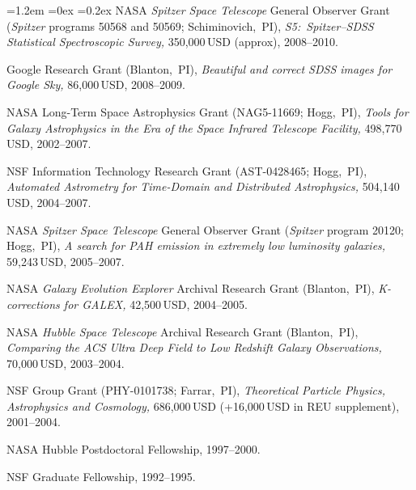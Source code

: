 \documentclass[10pt,letterpaper]{article}
\newcommand{\acronym}[1]{{\small{#1}}}
\newcommand{\project}[1]{\textsl{#1}}
\newcommand{\usd}[1]{{#1}\,\acronym{USD}}
\newcommand{\grantnumber}[2]{{\footnotesize{#1}}; #2,~\acronym{PI}}
\newcounter{refpubnum}
\newcommand{\hogglist}{%
    \rightmargin=0in
    \leftmargin=1.2em
    \topsep=0ex
    \partopsep=0pt
    \itemsep=0.2ex
    \parsep=0pt
    \itemindent=-1.0\leftmargin
    \listparindent=0.0\leftmargin
    \settowidth{\labelsep}{~}
    \usecounter{refpubnum}
  }
\begin{document}
\begin{list}{}{\hogglist}
\acronym{NASA} \project{Spitzer Space Telescope} General Observer Grant
(\project{Spitzer} programs {\footnotesize{50568}} and {\footnotesize{50569}}; Schiminovich,~\acronym{PI}),
\textit{\acronym{S5}:\ \project{Spitzer}--\project{\acronym{SDSS}} Statistical Spectroscopic Survey,}
\usd{350,000} (approx), 2008--2010.
\item
Google Research Grant
(Blanton,~\acronym{PI}), 
\textit{Beautiful and correct \project{\acronym{SDSS}} images for \project{Google Sky},}
\usd{86,000}, 2008--2009.
\item
\acronym{NASA} Long-Term Space Astrophysics Grant
(\grantnumber{NAG5-11669}{Hogg}),
\textit{Tools for Galaxy Astrophysics in the Era of the
\project{Space Infrared Telescope Facility,}}
\usd{498,770}, 2002--2007.
\item
\acronym{NSF} Information Technology Research Grant
(\grantnumber{AST-0428465}{Hogg}),
\textit{Automated Astrometry for Time-Domain and Distributed
Astrophysics,}
\usd{504,140}, 2004--2007.
\item
\acronym{NASA} \project{Spitzer Space Telescope} General Observer Grant
(\project{Spitzer} program {\footnotesize{20120}}; Hogg,~\acronym{PI}),
\textit{A search for \acronym{PAH} emission in extremely low luminosity galaxies,}
\usd{59,243}, 2005--2007.
\item
\acronym{NASA} \project{Galaxy Evolution Explorer} Archival Research Grant
(Blanton,~\acronym{PI}),
\textit{K-corrections for \acronym{GALEX},}
\usd{42,500}, 2004--2005.
\item
\acronym{NASA} \project{Hubble Space Telescope} Archival Research Grant
(Blanton,~\acronym{PI}),
\textit{Comparing the ACS Ultra Deep Field to Low Redshift Galaxy Observations,}
\usd{70,000}, 2003--2004.
\item
\acronym{NSF} Group Grant
(\grantnumber{PHY-0101738}{Farrar}),
\textit{Theoretical Particle Physics, Astrophysics and Cosmology,}
\usd{686,000} (+\usd{16,000} in \acronym{REU} supplement), 2001--2004.
\item
\acronym{NASA} Hubble Postdoctoral Fellowship, 1997--2000.
\item
\acronym{NSF} Graduate Fellowship, 1992--1995.
\end{list}
\end{document}

